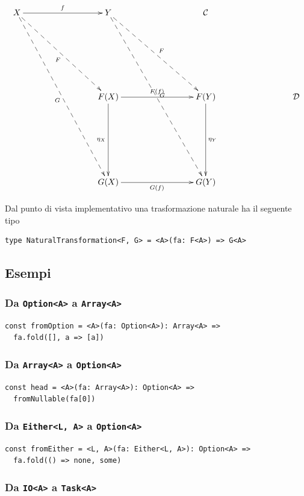 \documentclass[12pt]{article}
\begin{document}
\[
\xymatrixrowsep{3cm}
\xymatrixcolsep{3cm}
\xymatrix{
  X \ar@{-->}[rd]_{F} \ar@{-->}[rdd]_{G} \ar[r]^{f} & Y \ar@{-->}[rd]^{F} \ar@{-->}[rdd]^{G} & \mathcal{C} \\
  & F(X) \ar[r]^{F(f)} \ar[d]_{\eta_X} & F(Y) \ar[d]^{\eta_Y} & \mathcal{D} \\
  & G(X) \ar[r]_{G(f)} & G(Y) \\
}
\]

Dal punto di vista implementativo una trasformazione naturale ha il seguente tipo

\begin{verbatim}
type NaturalTransformation<F, G> = <A>(fa: F<A>) => G<A>
\end{verbatim}

\subsection{Esempi}

\subsubsection{Da \texttt{Option<A>} a \texttt{Array<A>}}

\begin{verbatim}
const fromOption = <A>(fa: Option<A>): Array<A> =>
  fa.fold([], a => [a])
\end{verbatim}

\subsubsection{Da \texttt{Array<A>} a \texttt{Option<A>}}

\begin{verbatim}
const head = <A>(fa: Array<A>): Option<A> =>
  fromNullable(fa[0])
\end{verbatim}

\subsubsection{Da \texttt{Either<L, A>} a \texttt{Option<A>}}

\begin{verbatim}
const fromEither = <L, A>(fa: Either<L, A>): Option<A> =>
  fa.fold(() => none, some)
\end{verbatim}

\subsubsection{Da \texttt{IO<A>} a \texttt{Task<A>}}
\end{document}
